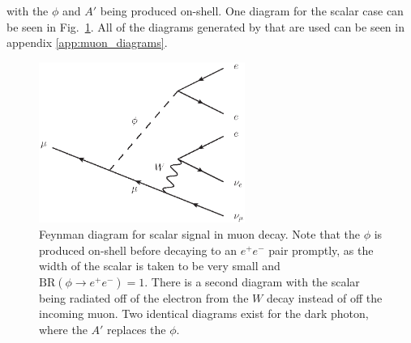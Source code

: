 \noindent with the $\phi$ and $A'$ being produced on-shell.
One diagram for the scalar case can be seen in Fig.\ \ref{fig:mu_eeenunu_scalar}.
All of the diagrams generated by \madgraph that are used can be seen in appendix \ref{app:muon_diagrams}.

\begin{figure}[h]
    \centering
    \includegraphics[width=0.6\textwidth]{Figures/feynman_diagrams/mu_eeenunu_scalar}
    \caption{Feynman diagram for scalar signal in muon decay. Note that the $\phi$ is produced on-shell before decaying to an $e^+ e^-$ pair promptly, as the width of the scalar is taken to be very small and $\textrm{BR}(\phi \rightarrow e^+ e^-) = 1$. There is a second diagram with the scalar being radiated off of the electron from the $W$ decay instead of off the incoming muon. Two identical diagrams exist for the dark photon, where the $A'$ replaces the $\phi$.}
    \label{fig:mu_eeenunu_scalar}
\end{figure}


